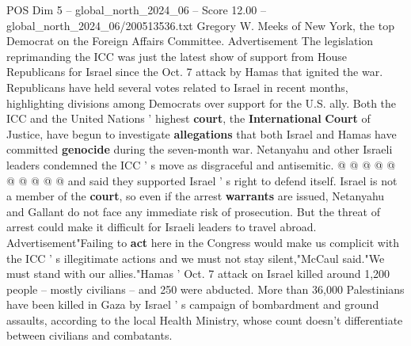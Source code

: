 \begin{textsample}{POS Dim 5 – global\_north\_2024\_06 – Score 12.00 – global\_north\_2024\_06/200513536.txt}
Gregory W.
Meeks of New York, the top Democrat on the Foreign Affairs Committee.
Advertisement The legislation reprimanding the ICC was just the latest show of support from House Republicans for Israel since the Oct. 7 attack by Hamas that ignited the war.
Republicans have held several votes related to Israel in recent months, highlighting divisions among Democrats over support for the U.S. ally.
Both the ICC and the United Nations ' highest \textbf{court}, the \textbf{International} \textbf{Court} of Justice, have begun to investigate \textbf{allegations} that both Israel and Hamas have committed \textbf{genocide} during the seven-month war.
Netanyahu and other Israeli leaders condemned the ICC ' s move as disgraceful and antisemitic. @ @ @ @ @ @ @ @ @ @ and said they supported Israel ' s right to defend itself.
Israel is not a member of the \textbf{court}, so even if the arrest \textbf{warrants} are issued, Netanyahu and Gallant do not face any immediate risk of prosecution.
But the threat of arrest could make it difficult for Israeli leaders to travel abroad.
Advertisement"Failing to \textbf{act} here in the Congress would make us complicit with the ICC ' s illegitimate actions and we must not stay silent,"McCaul said."We must stand with our allies."Hamas ' Oct. 7 attack on Israel killed around 1,200 people -- mostly civilians -- and 250 were abducted.
More than 36,000 Palestinians have been killed in Gaza by Israel ' s campaign of bombardment and ground assaults, according to the local Health Ministry, whose count doesn't differentiate between civilians and combatants.

\end{textsample}
